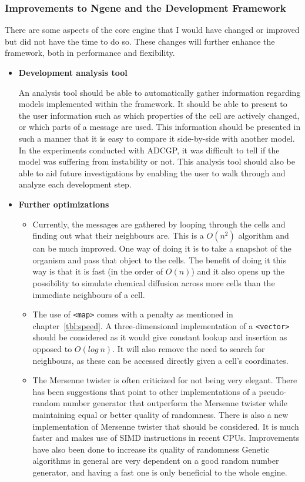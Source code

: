 \subsubsection{Improvements to Ngene and the Development Framework}
\label{sec:improvements}
There are some aspects of the core engine that I would have changed or improved but did not have the time to do so. These changes will further enhance the framework, both in performance and flexibility.

\begin{itemize}
	\item\textbf{Development analysis tool}

	An analysis tool should be able to automatically gather information regarding models implemented within the framework. It should be able to present to the user information such as which properties of the cell are actively changed, or which parts of a message are used. This information should be presented in such a manner that it is easy to compare it side-by-side with another model. In the experiments conducted with ADCGP, it was difficult to tell if the model was suffering from instability or not. This analysis tool should also be able to aid future investigations by enabling the user to walk through and analyze each development step.

	\item\textbf{Further optimizations}
		\begin{itemize}
			\item Currently, the messages are gathered by looping through the cells and finding out what their neighbours are. This is a $O(n^{2})$ algorithm and can be much improved. One way of doing it is to take a snapshot of the organism and pass that object to the cells. The benefit of doing it this way is that it is fast (in the order of $O(n)$) and it also opens up the possibility to simulate chemical diffusion across more cells than the immediate neighbours of a cell.

			\item The use of \texttt{<map>} comes with a penalty as mentioned in chapter~\ref{tbl:speed}. A three-dimensional implementation of a \texttt{<vector>} should be considered as it would give constant lookup and insertion as opposed to $O(log~n)$. It will also remove the need to search for neighbours, as these can be accessed directly given a cell's coordinates.

			\item The Mersenne twister is often criticized for not being very elegant. There has been suggestions that point to other implementations of a pseudo-random number generator that outperform the Mersenne twister while maintaining equal or better quality of randomness. There is also a new implementation of Mersenne twister that should be considered. It is much faster and makes use of SIMD instructions in recent CPUs. Improvements have also been done to increase its quality of randomness Genetic algorithms in general are very dependent on a good random number generator, and having a fast one is only beneficial to the whole engine.


\end{itemize}
\end{itemize}
